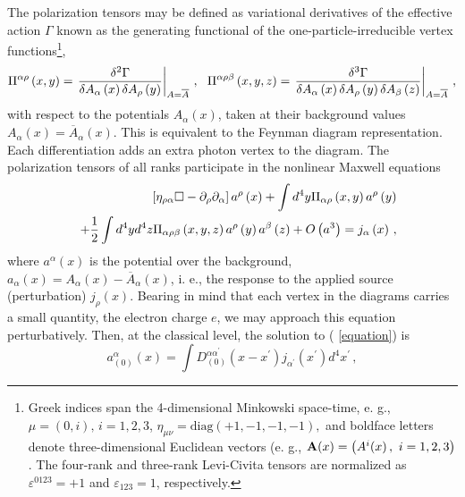 \documentclass[12pt]{article}
\begin{document}
The polarization tensors may be defined as variational derivatives of the
effective action $\Gamma $ known as \cite{weinberg} the generating
functional of the one-particle-irreducible vertex functions\footnote{%
Greek indices span the 4-dimensional Minkowski space-time, e. g., $\mu
=(0,i),\,i=1,2,3$, $\eta _{\mu \nu }=\mathrm{diag}(+1,-1,-1,-1),$ and
boldface letters denote three-dimensional Euclidean vectors (e. g., $\mathbf{%
A}(x)=\left( A^{i}(x)\,,\,\,i=1,2,3\right) $. The four-rank and three-rank
Levi-Civita tensors are normalized as $\varepsilon ^{0123}=+1$ and $%
\varepsilon _{123}=1$, respectively.},%
\begin{equation}
\Pi ^{\alpha \rho }\left( x,y\right) =\left. \frac{\delta ^{2}\Gamma }{%
\delta A_{\alpha }\left( x\right) \delta A_{\rho }\left( y\right) }%
\right\vert _{A=\overline{A}}\,,\text{\ \ }\Pi ^{\alpha \rho \beta }\left(
x,y,z\right) =\left. \frac{\delta ^{3}\Gamma }{\delta A_{\alpha }\left(
x\right) \delta A_{\rho }\left( y\right) \delta A_{\beta }\left( z\right) }%
\right\vert _{A=\overline{A}}\,,  \notag
\end{equation}%
with respect to the potentials $A_{\alpha }\left( x\right) $, taken at their
background values $A_{\alpha }\left( x\right) =\overline{A}_{\alpha }\left(
x\right) $. This is equivalent to the Feynman diagram representation. Each
differentiation adds an extra photon vertex to the diagram. The polarization
tensors of all ranks participate in the nonlinear Maxwell equations%
\begin{eqnarray}
&&\left[ \eta _{\rho \alpha }\square -\partial _{\rho }\partial _{\alpha }%
\right] a^{\rho }\left( x\right) +\int d^{4}y\Pi _{\alpha \rho }\left(
x,y\right) a^{\rho }\left( y\right)   \notag \\
&&+\frac{1}{2}\int d^{4}yd^{4}z\Pi _{\alpha \rho \beta }\left( x,y,z\right)
a^{\rho }\left( y\right) a^{\beta }\left( z\right) +O\left( a^{3}\right)
=j_{\alpha }\left( x\right) \,,  \label{equation}
\end{eqnarray}%
where $a^{\alpha }\left( x\right) $ is the potential over the background, $%
a_{\alpha }\left( x\right) =A_{\alpha }\left( x\right) -\overline{A}_{\alpha
}\left( x\right) $, i. e., the response to the applied source (perturbation) 
$j_{\rho }\left( x\right) $. Bearing in mind that each vertex in the
diagrams carries a small quantity, the electron charge $e$, we may approach
this equation perturbatively. Then, at the classical level, the solution to (%
\ref{equation}) is 
\begin{equation}
a_{(0)}^{\alpha }\left( x\right) =\int D_{(0)}^{\alpha \alpha ^{\prime
}}(x-x^{\prime })j_{\alpha ^{\prime }}\left( x^{\prime }\right)
d^{4}x^{\prime }\,,  \label{0}
\end{equation}%
\end{document}

